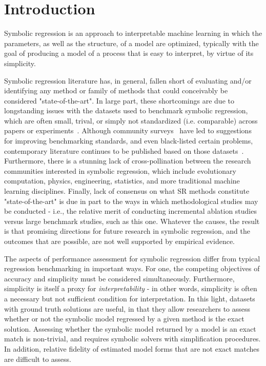 
\section{Introduction}

Symbolic regression is an approach to interpretable machine learning in which the parameters, as well as the structure, of a model are optimized, typically with the goal of producing a model of a process that is easy to interpret, by virtue of its simplicity. 

Symbolic regression literature has, in general, fallen short of evaluating and/or identifying any method or family of methods that could conceivably be considered "state-of-the-art". 
In large part, these shortcomings are due to longstanding issues with the datasets used to benchmark symbolic regression, which are often small, trival, or simply not standardized (i.e. comparable) across papers or experiments~\cite{mcdermottGeneticProgrammingNeeds2012b}. 
Although community surveys~\cite{whiteBetterGPBenchmarks2012a,mcdermottGeneticProgrammingNeeds2012b} have led to suggestions for improving benchmarking standards, and even black-listed certain problems, contemporary literature continues to be published based on those datasets~\cite{petersenDeepSymbolicRegression2020}.
Furthermore, there is a stunning lack of cross-pollination between the research communities interested in symbolic regression, which include evolutionary computation, physics, engineering, statistics, and more traditional machine learning disciplines. 
Finally, lack of consensus on what SR methods constitute "state-of-the-art" is due in part to the ways in which methodological studies may be conducted - i.e., the relative merit of conducting incremental ablation studies versus large benchmark studies, such as this one. 
Whatever the causes, the result is that promising directions for future research in symbolic regression, and the outcomes that are possible, are not well supported by empirical evidence. 


The aspects of performance assessment for symbolic regression differ from typical regression benchmarking in important ways. 
For one, the competing objectives of accuracy and simplicity must be considered simultaneously.  
Furthermore, simplicity is itself a proxy for \textit{interpretability} - in other words, simplicity is often a necessary but not sufficient condition for interpretation.  
In this light, datasets with ground truth solutions are useful, in that they allow researchers to assess whether or not the symbolic model regressed by a given method is the exact solution. 
Assessing whether the symbolic model returned by a model is an exact match is non-trivial, and requires symbolic solvers with simplification procedures.
In addition, relative fidelity of estimated model forms that are not exact matches are difficult to assess.

